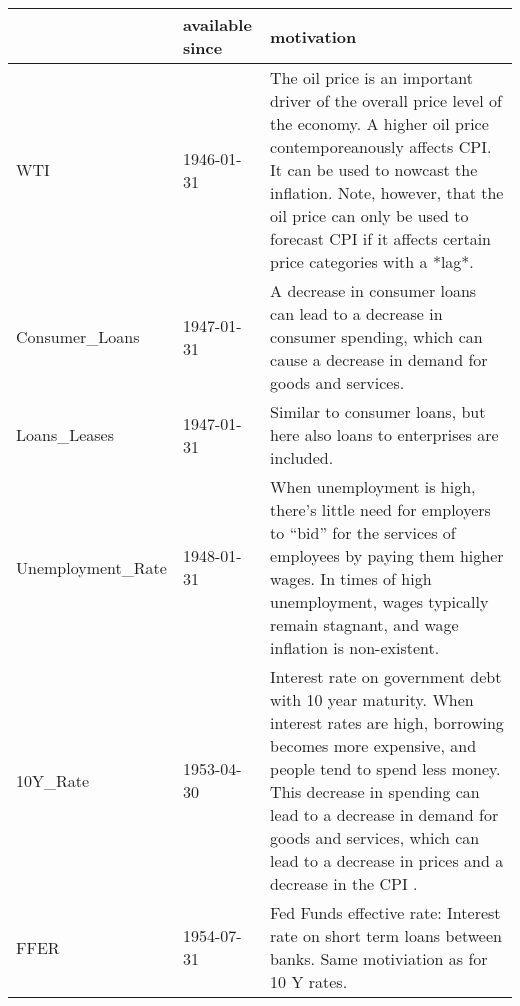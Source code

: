 \documentclass[12pt]{article}
\begin{document}
 \begin{adjustwidth}{-2cm}{}
\begin{longtable}{llp{6cm}}

\toprule
{} &          available since & motivation \\
\midrule
WTI                              & 1946-01-31 & The oil price is an important driver of the overall price level of the economy. A higher oil price contemporeanously affects CPI. It can be used to nowcast the inflation. Note, however, that the oil price can only be used to forecast CPI if it affects certain price categories with a *lag*.  \\
Consumer\_Loans                       & 1947-01-31 & A decrease in consumer loans can lead to a decrease in consumer spending, which can cause a decrease in demand for goods and services.  \\
Loans\_Leases                         & 1947-01-31 & Similar to consumer loans, but here also loans to enterprises are included.\\
Unemployment\_Rate                       & 1948-01-31 & When unemployment is high, there’s little need for employers to “bid” for the services of employees by paying them higher wages. In times of high unemployment, wages typically remain stagnant, and wage inflation is non-existent. \\
10Y\_Rate                                     & 1953-04-30 & Interest rate on government debt with 10 year maturity. When interest rates are high, borrowing becomes more expensive, and people tend to spend less money. This decrease in spending can lead to a decrease in demand for goods and services, which can lead to a decrease in prices and a decrease in the CPI . \\
FFER                                     & 1954-07-31 &  Fed Funds effective rate: Interest rate on short term loans between banks. Same motiviation as for 10 Y rates. \\


\end{longtable}
\end{adjustwidth}
\end{document}
